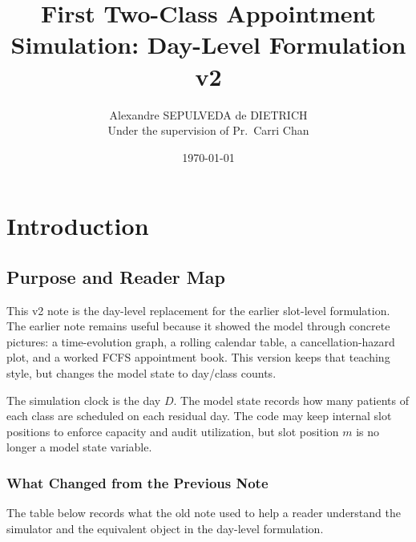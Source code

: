 \documentclass[11pt]{article}
\title{First Two-Class Appointment Simulation: Day-Level Formulation v2}
\author{Alexandre SEPULVEDA de DIETRICH\\Under the supervision of Pr.~Carri Chan}
\date{\today}
\begin{document}
\maketitle
\setcounter{tocdepth}{3}
\tableofcontents
\bigskip

\section{Introduction}

\subsection{Purpose and Reader Map}

This v2 note is the day-level replacement for the earlier slot-level formulation. The earlier
note remains useful because it showed the model through concrete pictures: a time-evolution graph,
a rolling calendar table, a cancellation-hazard plot, and a worked FCFS appointment book. This
version keeps that teaching style, but changes the model state to day/class counts.

\begin{keybox}[title={Core Modeling Choice}]
The simulation clock is the day \(D\). The model state records how many patients of each class are
scheduled on each residual day. The code may keep internal slot positions to enforce capacity and
audit utilization, but slot position \(m\) is no longer a model state variable.
\end{keybox}

\subsubsection{What Changed from the Previous Note}

The table below records what the old note used to help a reader understand the simulator and the
equivalent object in the day-level formulation.
\end{document}

